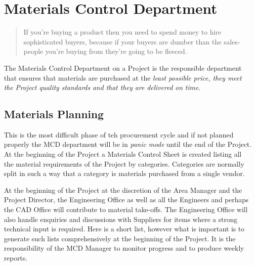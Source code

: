 


\chapter{Materials Control Department}

\begin{quotation}
 If you're buying a product then you need to spend money to hire sophisticated buyers, because if your buyers are dumber than the sales-people you're buying from they're going to be fleeced.
\end{quotation}

The Materials Control Department on a Project is the responsible department that ensures that materials are purchased at the \textit{least possible price, they
meet the Project quality standards  and that they are delivered on time}. 

\section*{Materials Planning}
This is the most difficult phase of teh procurement cycle and if not planned
properly the MCD department will be in \textit{panic mode} until the end of the
Project. At the beginning of the Project a Materials Control Sheet is created
listing all the material requirements of the Project by categories. Categories
are normally split in such a way that a category is materials purchased from a single
vendor.

At the beginning of the Project at the discretion of the Area Manager and the Project
Director, the Engineering Office as well as all the Engineers and perhaps the
CAD Office will contribute to material take-offs. The Engineering Office
will also handle enquiries and discussions with Suppliers for items where
a strong technical input is required. Here is a short list, however what is important
is to generate such lists comprehensively at the beginning of the Project. It is the 
responsibility of the MCD Manager to monitor progress and to produce weekly reports.

